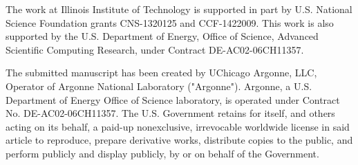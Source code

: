 \documentclass[conference,compsoc]{IEEEtran}
\begin{document}
The work at Illinois Institute of Technology is supported in part by U.S. National Science Foundation grants CNS-1320125 and CCF-1422009. This work is also supported by the U.S. Department of Energy, Office of Science, Advanced Scientific Computing Research, under Contract DE-AC02-06CH11357.





  


 \vspace{1\baselineskip}
 
 \begin{framed}
 The submitted manuscript has been created by UChicago Argonne, LLC, Operator of Argonne National Laboratory ("Argonne").  Argonne, a U.S. Department of Energy Office of Science laboratory, is operated under Contract No. DE-AC02-06CH11357.  The U.S. Government retains for itself, and others acting on its behalf, a paid-up nonexclusive, irrevocable worldwide license in said article to reproduce, prepare derivative works, distribute copies to the public, and perform publicly and display publicly, by or on behalf of the Government.
 \end{framed}




\end{document}
